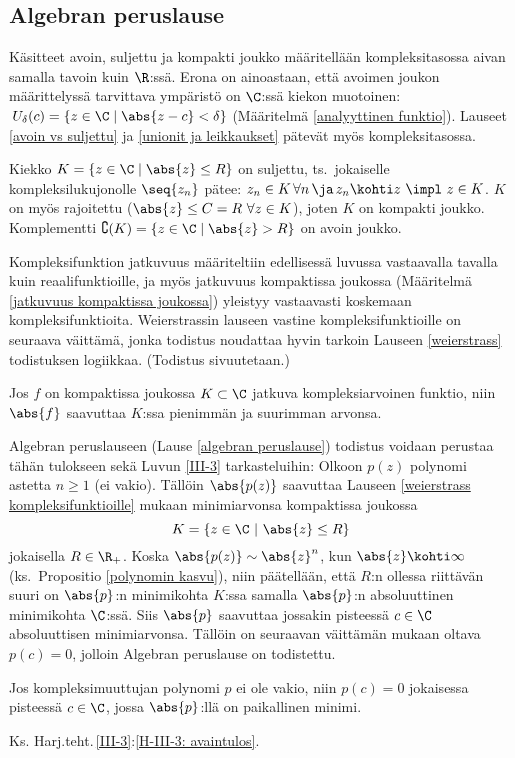 \subsection{Algebran peruslause}

Käsitteet avoin, suljettu ja kompakti joukko määritellään kompleksitasossa aivan samalla
tavoin kuin $\R$:ssä. Erona on ainoastaan, että avoimen joukon määrittelyssä tarvittava
ympäristö on $\C$:ssä kiekon muotoinen: $\,U_\delta(c)=\{z\in\C \mid \abs{z-c}<\delta\}$
(Määritelmä \ref{analyyttinen funktio}). Lauseet \ref{avoin vs suljettu} ja
\ref{unionit ja leikkaukset} pätevät myös kompleksitasossa.
\begin{Exa} Kiekko $K=\{z\in\C \mid \abs{z} \le R\}$ on suljettu, ts.\ jokaiselle
kompleksilukujonolle $\seq{z_n}$ pätee: 
$z_n \in K\,\forall n\,\ja\,z_n \kohti z\ \impl\ z \in K$. $K$ on myös rajoitettu
($\abs{z} \le C=R\ \forall z \in K$), joten $K$ on kompakti joukko. Komplementti
$\complement(K)=\{z\in\C \mid \abs{z}>R\}$ on avoin joukko. \loppu
\end{Exa}
Kompleksifunktion jatkuvuus määriteltiin edellisessä luvussa vastaavalla tavalla kuin
reaalifunktioille, ja myös jatkuvuus kompaktissa joukossa (Määritelmä 
\ref{jatkuvuus kompaktissa joukossa}) yleistyy vastaavasti koskemaan kompleksifunktioita.
Weierstrassin lauseen vastine kompleksifunktioille on seuraava väittämä, jonka todistus
noudattaa hyvin tarkoin Lauseen \ref{weierstrass} todistuksen logiikkaa.
(Todistus sivuutetaan.)
\begin{*Lause} \label{weierstrass kompleksifunktioille}
Jos $f$ on kompaktissa joukossa $K\subset\C$ jatkuva kompleksiarvoinen funktio, niin
$\abs{f}$ saavuttaa $K$:ssa pienimmän ja suurimman arvonsa.
\end{*Lause}
Algebran peruslauseen (Lause \ref{algebran peruslause}) todistus voidaan perustaa tähän
tulokseen sekä Luvun \ref{III-3} tarkasteluihin: Olkoon $p(z)$ polynomi astetta $n \ge 1$
(ei vakio). Tällöin $\abs{p(z)}$ saavuttaa Lauseen \ref{weierstrass kompleksifunktioille}
mukaan minimiarvonsa kompaktissa joukossa
\[
K=\{z\in\C \ | \ \abs{z}\leq R\}
\]
jokaisella $R \in \R_+$. Koska $\abs{p(z)} \sim \abs{z}^n$, kun $\abs{z}\kohti\infty$ 
(ks.\ Propositio \ref{polynomin kasvu}), niin päätellään, että $R$:n ollessa riittävän suuri
on $\abs{p}$:n minimikohta $K$:ssa samalla $\abs{p}$:n absoluuttinen minimikohta $\C$:ssä. Siis 
$\abs{p}$ saavuttaa jossakin pisteessä $c \in \C$ absoluuttisen minimiarvonsa. Tällöin on
seuraavan väittämän mukaan oltava $p(c)=0$, jolloin Algebran peruslause on todistettu.
\begin{Lause} \label{polynomitulos} Jos kompleksimuuttujan polynomi $p$ ei ole vakio, niin 
$p(c)=0$ jokaisessa pisteessä $c \in \C$, jossa $\abs{p}$:llä on paikallinen minimi. 
\end{Lause}
\tod Ks. Harj.teht.\,\ref{III-3}:\ref{H-III-3: avaintulos}. \loppu


